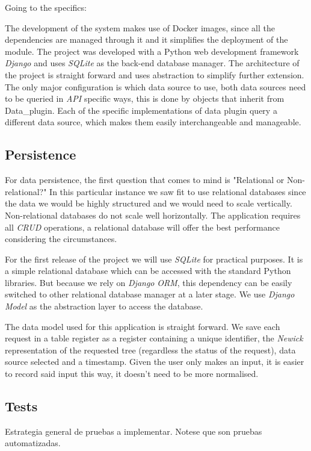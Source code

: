 \documentclass[10pt]{article}
\begin{document}
 Going to the specifics:
 
The development of the system makes use of Docker images, since all the dependencies are managed through it and it simplifies the deployment of the module. The project was developed with a Python web development framework \textit{Django} and uses \textit{SQLite} as the back-end database manager. The architecture of the project is straight forward and uses abstraction to simplify further extension. The only major configuration is which data source to use, both data sources need to be queried in \textit{API} specific ways, this is done by objects that inherit from Data\_plugin. Each of the specific implementations of data plugin query a different data source, which makes them easily interchangeable and manageable.

 \subsection{Persistence}
 
For data persistence, the first question that comes to mind is "Relational or Non-relational?" In this particular instance we saw fit to use relational databases since the data we would be highly structured and we would need to scale vertically. Non-relational databases do not scale well horizontally. The application requires all \textit{CRUD} operations, a relational database will offer the best performance considering the circumstances.

For the first release of the project we will use \textit{SQLite} for practical purposes. It is a simple relational database which can be accessed with the standard Python libraries. But because we rely on \textit{Django} \textit{ORM}, this dependency can be easily switched to other relational database manager at a later stage. We use \textit{Django Model} as the abstraction layer to access the database.

The data model used for this application is straight forward. We save each request in a table register as a register containing a unique identifier, the \textit{Newick} representation of the requested tree (regardless the status of the request), data source selected and a timestamp. Given the user only makes an input, it is easier to record said input this way, it doesn't need to be more normalised.
 
 \subsection{Tests}
 Estrategia general de pruebas a implementar. Notese que son pruebas automatizadas. %
\end{document}
